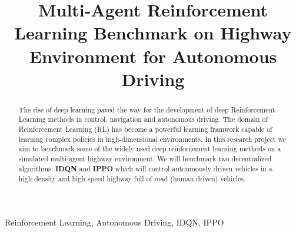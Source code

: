 \documentclass[conference]{IEEEtran}
\begin{document}
\title{Multi-Agent Reinforcement Learning Benchmark on Highway Environment for Autonomous Driving\\}


\author{
}

\maketitle

\begin{abstract}
The rise of deep learning paved the way for the development of deep Reinforcement Learning methods in control, navigation and autonomous driving.
The domain of Reinforcement Learning (RL) has become a powerful learning framwork capable of learning complex policies in high-dimensional environments. In this research project
we aim to benchmark some of the widely used deep reinforcement learning methods on a simulated multi-agent highway environment. We will benchmark two decentralized algorithms; \textbf{IDQN} and \textbf{IPPO} 
which will control autonmously driven vehicles in a high density and high speed highway full of road (human driven) vehicles.  
\end{abstract}

\begin{IEEEkeywords}
Reinforcement Learning, Autonomous Driving, IDQN, IPPO
\end{IEEEkeywords}
\end{document}
